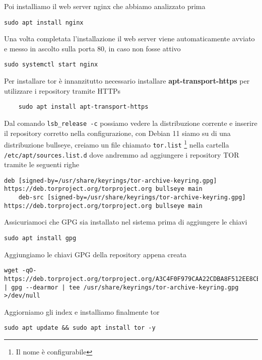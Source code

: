 Poi installiamo il web server nginx che abbiamo analizzato prima
\begin{lstlisting}[caption={Installazione Nginx}]
    sudo apt install nginx
\end{lstlisting}

Una volta completata l'installazione il web server viene automaticamente avviato e messo in ascolto sulla porta 80, in caso non fosse attivo \\
\begin{lstlisting}[caption={Avvio di Nginx}]
    sudo systemctl start nginx
\end{lstlisting}

Per installare tor è innanzitutto necessario installare \textbf{apt-transport-https} per utilizzare i repository tramite HTTPs
\begin{lstlisting}
    sudo apt install apt-transport-https
\end{lstlisting}
Dal comando \lstinline{lsb_release -c} possiamo vedere la distribuzione corrente e inserire il repository corretto nella configurazione, con Debian 11 siamo su di una distribuzione bullseye, creiamo un file chiamato \lstinline{tor.list} \footnote{Il nome è configurabile} nella cartella \lstinline{/etc/apt/sources.list.d} dove andremmo ad aggiungere i repository TOR tramite le seguenti righe
\begin{lstlisting}[caption={Tor Repository}]
    deb [signed-by=/usr/share/keyrings/tor-archive-keyring.gpg] https://deb.torproject.org/torproject.org bullseye main
    deb-src [signed-by=/usr/share/keyrings/tor-archive-keyring.gpg] https://deb.torproject.org/torproject.org bullseye main
\end{lstlisting}

Assicuriamoci che GPG sia installato nel sistema prima di aggiungere le chiavi
\begin{lstlisting}[caption={Installazione GPG}]
    sudo apt install gpg
\end{lstlisting}

Aggiungiamo le chiavi GPG della repository appena creata
\begin{lstlisting}[caption={Aggiunta chiavi gpg dal repository Tor}]
    wget -qO- https://deb.torproject.org/torproject.org/A3C4F0F979CAA22CDBA8F512EE8CBC9E886DDD89.asc | gpg --dearmor | tee /usr/share/keyrings/tor-archive-keyring.gpg >/dev/null
\end{lstlisting}

Aggiorniamo gli index e installiamo finalmente tor
\begin{lstlisting}[caption={Installazione Tor}]
    sudo apt update && sudo apt install tor -y 
\end{lstlisting}

